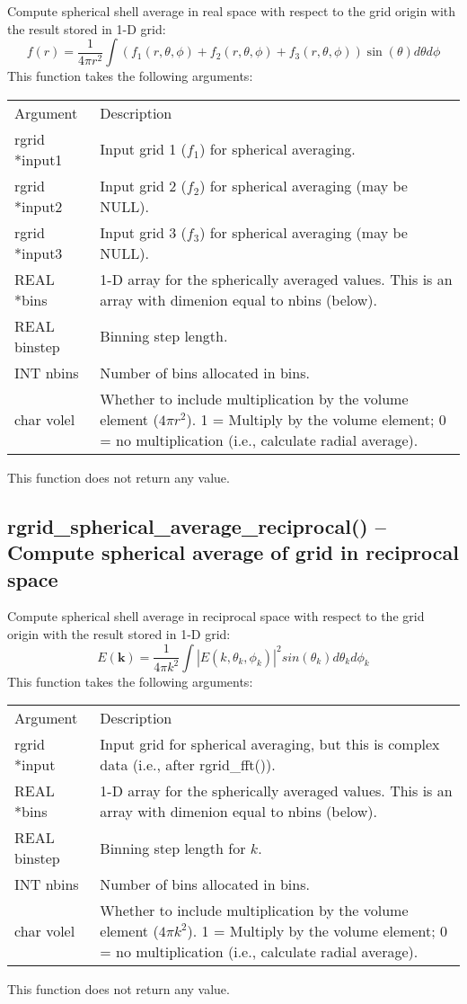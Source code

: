 \documentclass[12pt,letterpaper]{report}
\begin{document}
Compute spherical shell average in real space with respect to the grid origin with the result stored in 1-D grid:
$$f(r) = \frac{1}{4\pi r^2}\int \left(f_1(r, \theta, \phi) + f_2(r, \theta, \phi) + f_3(r, \theta, \phi)\right) \sin(\theta) d\theta d\phi$$
This function takes the following arguments:
\begin{longtable}{p{} p{}}
Argument & Description\\
\cline{1-2}
rgrid *input1 & Input grid 1 ($f_1$) for spherical averaging.\\
rgrid *input2 & Input grid 2 ($f_2$) for spherical averaging (may be NULL).\\
rgrid *input3 & Input grid 3 ($f_3$) for spherical averaging (may be NULL).\\
REAL *bins & 1-D array for the spherically averaged values. This is an array with dimenion equal to nbins (below).\\
REAL binstep & Binning step length.\\
INT nbins & Number of bins allocated in bins.\\
char volel & Whether to include multiplication by the volume element ($4\pi r^2$). 1 = Multiply by the volume element; 0 = no multiplication (i.e., calculate radial average).\\
\end{longtable}
\noindent
This function does not return any value.

\subsection{rgrid\_spherical\_average\_reciprocal() -- Compute spherical average of grid in reciprocal space}

Compute spherical shell average in reciprocal space with respect to the grid origin with the result stored in 1-D grid:
$$E(\mathbf{k}) = \frac{1}{4\pi k^2} \int |E(k, \theta_k, \phi_k)|^2 sin(\theta_k) d\theta_k d\phi_k$$
This function takes the following arguments:
\begin{longtable}{p{} p{}}
Argument & Description\\
\cline{1-2}
rgrid *input & Input grid for spherical averaging, but this is complex data (i.e., after rgrid\_fft()).\\
REAL *bins & 1-D array for the spherically averaged values. This is an array with dimenion equal to nbins (below).\\
REAL binstep & Binning step length for $k$.\\
INT nbins & Number of bins allocated in bins.\\
char volel & Whether to include multiplication by the volume element ($4\pi k^2$). 1 = Multiply by the volume element; 0 = no multiplication (i.e., calculate radial average).\\
\end{longtable}
\noindent
This function does not return any value. 
\end{document}
